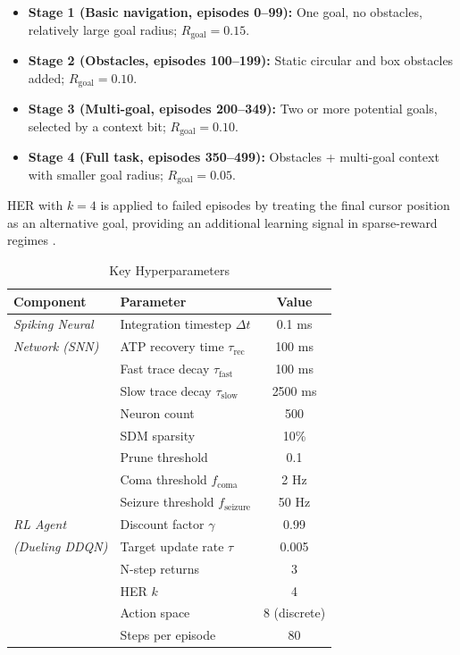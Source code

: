 \documentclass[journal]{IEEEtran}
\begin{document}
\begin{itemize}
    \item \textbf{Stage 1 (Basic navigation, episodes 0--99):} One goal, no obstacles, relatively large goal radius; $R_{\mathrm{goal}} = 0.15$.
    \item \textbf{Stage 2 (Obstacles, episodes 100--199):} Static circular and box obstacles added; $R_{\mathrm{goal}} = 0.10$.
    \item \textbf{Stage 3 (Multi-goal, episodes 200--349):} Two or more potential goals, selected by a context bit; $R_{\mathrm{goal}} = 0.10$.
    \item \textbf{Stage 4 (Full task, episodes 350--499):} Obstacles + multi-goal context with smaller goal radius; $R_{\mathrm{goal}} = 0.05$.
\end{itemize}

HER with $k=4$ is applied to failed episodes by treating the final cursor position as an alternative goal, providing an additional learning signal in sparse-reward regimes \cite{Andrychowicz2017HER}.

\begin{table}[h]
\centering
\caption{Key Hyperparameters}
\label{table:hyperparameters}
\begin{tabular}{llc}
\hline
\textbf{Component} & \textbf{Parameter} & \textbf{Value} \\ \hline
\textit{Spiking Neural} & Integration timestep $\Delta t$ & 0.1 ms \\
\textit{Network (SNN)}  & ATP recovery time $\tau_{\text{rec}}$ & 100 ms \\
                        & Fast trace decay $\tau_{\text{fast}}$ & 100 ms \\
                        & Slow trace decay $\tau_{\text{slow}}$ & 2500 ms \\
                        & Neuron count & 500 \\
                        & SDM sparsity & 10\% \\
                        & Prune threshold & 0.1 \\
                        & Coma threshold $f_{\text{coma}}$ & 2 Hz \\
                        & Seizure threshold $f_{\text{seizure}}$ & 50 Hz \\ \hline
\textit{RL Agent}       & Discount factor $\gamma$ & 0.99 \\
\textit{(Dueling DDQN)} & Target update rate $\tau$ & 0.005 \\
                        & N-step returns & 3 \\
                        & HER $k$ & 4 \\
                        & Action space & 8 (discrete) \\
                        & Steps per episode & 80 \\ \hline
\end{tabular}
\end{table}
\end{document}
